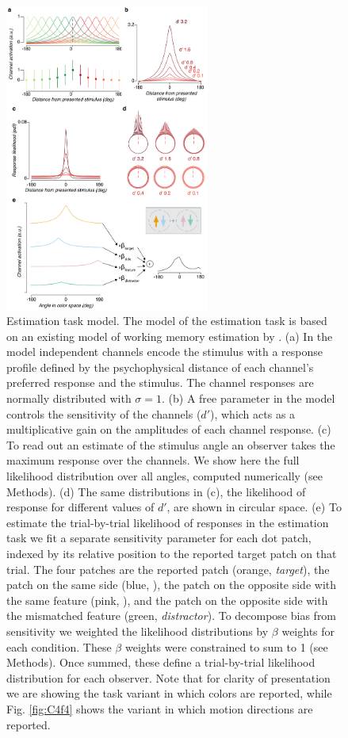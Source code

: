 \begin{figure}
\centering
\includegraphics[keepaspectratio,width=0.6\textwidth]{figs_c4/f3_TCC_model.pdf}
\caption[Estimation task model]{Estimation task model. The model of the estimation task is based on an existing model of working memory estimation by \citet{Schurgin2018-vi}. (a) In the model independent channels encode the stimulus with a response profile defined by the psychophysical distance of each channel's preferred response and the stimulus. The channel responses are normally distributed with $\sigma=1$. (b) A free parameter in the model controls the sensitivity of the channels ($d'$), which acts as a multiplicative gain on the amplitudes of each channel response. (c) To read out an estimate of the stimulus angle an observer takes the maximum response over the channels. We show here the full likelihood distribution over all angles, computed numerically (see Methods). (d) The same distributions in (c), the likelihood of response for different values of $d'$, are shown in circular space. (e) To estimate the trial-by-trial likelihood of responses in the estimation task we fit a separate sensitivity parameter for each dot patch, indexed by its relative position to the reported target patch on that trial. The four patches are the reported patch (orange, \textit{target}), the patch on the same side (blue, ), the patch on the opposite side with the same feature (pink, ), and the patch on the opposite side with the mismatched feature (green, \textit{distractor}). To decompose bias from sensitivity we weighted the likelihood distributions by $\beta$ weights for each condition. These $\beta$ weights were constrained to sum to 1 (see Methods). Once summed, these define a trial-by-trial likelihood distribution for each observer. Note that for clarity of presentation we are showing the task variant in which colors are reported, while Fig. \ref{fig:C4f4} shows the variant in which motion directions are reported.}
\label{fig:c4f5}
\end{figure}

